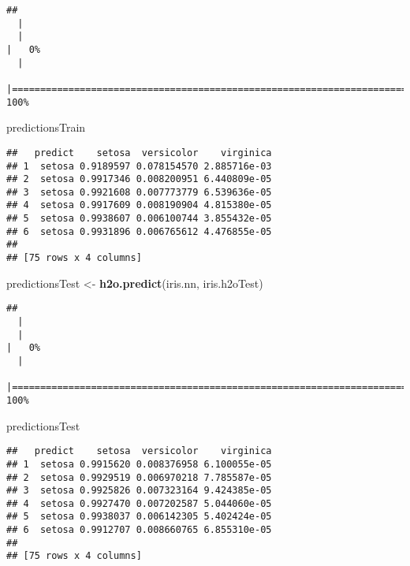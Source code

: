 \documentclass[
]{book}
\newenvironment{Shaded}{\begin{snugshade}}{\end{snugshade}}
\newcommand{\KeywordTok}[1]{\textcolor[rgb]{0.13,0.29,0.53}{\textbf{#1}}}
\newcommand{\NormalTok}[1]{#1}
\newcommand{\StringTok}[1]{\textcolor[rgb]{0.31,0.60,0.02}{#1}}
\begin{document}
\begin{verbatim}
## 
  |                                                                            
  |                                                                      |   0%
  |                                                                            
  |======================================================================| 100%
\end{verbatim}

\begin{Shaded}
\begin{Highlighting}[]
\NormalTok{predictionsTrain}
\end{Highlighting}
\end{Shaded}

\begin{verbatim}
##   predict    setosa  versicolor    virginica
## 1  setosa 0.9189597 0.078154570 2.885716e-03
## 2  setosa 0.9917346 0.008200951 6.440809e-05
## 3  setosa 0.9921608 0.007773779 6.539636e-05
## 4  setosa 0.9917609 0.008190904 4.815380e-05
## 5  setosa 0.9938607 0.006100744 3.855432e-05
## 6  setosa 0.9931896 0.006765612 4.476855e-05
## 
## [75 rows x 4 columns]
\end{verbatim}

\begin{Shaded}
\begin{Highlighting}[]
\NormalTok{predictionsTest <-}\StringTok{ }\KeywordTok{h2o.predict}\NormalTok{(iris.nn, iris.h2oTest)}
\end{Highlighting}
\end{Shaded}

\begin{verbatim}
## 
  |                                                                            
  |                                                                      |   0%
  |                                                                            
  |======================================================================| 100%
\end{verbatim}

\begin{Shaded}
\begin{Highlighting}[]
\NormalTok{predictionsTest}
\end{Highlighting}
\end{Shaded}

\begin{verbatim}
##   predict    setosa  versicolor    virginica
## 1  setosa 0.9915620 0.008376958 6.100055e-05
## 2  setosa 0.9929519 0.006970218 7.785587e-05
## 3  setosa 0.9925826 0.007323164 9.424385e-05
## 4  setosa 0.9927470 0.007202587 5.044060e-05
## 5  setosa 0.9938037 0.006142305 5.402424e-05
## 6  setosa 0.9912707 0.008660765 6.855310e-05
## 
## [75 rows x 4 columns]
\end{verbatim}
\end{document}
